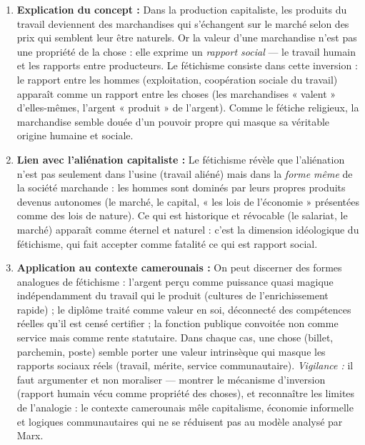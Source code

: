 \documentclass[11pt]{article}
\begin{document}
\begin{corrige}
\begin{enumerate}
\item \textbf{Explication du concept :} Dans la production capitaliste, les produits du travail deviennent des marchandises qui s'échangent sur le marché selon des prix qui semblent leur être naturels. Or la valeur d'une marchandise n'est pas une propriété de la chose : elle exprime un \emph{rapport social} — le travail humain et les rapports entre producteurs. Le fétichisme consiste dans cette inversion : le rapport entre les hommes (exploitation, coopération sociale du travail) apparaît comme un rapport entre les choses (les marchandises « valent » d'elles-mêmes, l'argent « produit » de l'argent). Comme le fétiche religieux, la marchandise semble douée d'un pouvoir propre qui masque sa véritable origine humaine et sociale.
\item \textbf{Lien avec l'aliénation capitaliste :} Le fétichisme révèle que l'aliénation n'est pas seulement dans l'usine (travail aliéné) mais dans la \emph{forme même} de la société marchande : les hommes sont dominés par leurs propres produits devenus autonomes (le marché, le capital, « les lois de l'économie » présentées comme des lois de nature). Ce qui est historique et révocable (le salariat, le marché) apparaît comme éternel et naturel : c'est la dimension idéologique du fétichisme, qui fait accepter comme fatalité ce qui est rapport social.
\item \textbf{Application au contexte camerounais :} On peut discerner des formes analogues de fétichisme : l'argent perçu comme puissance quasi magique indépendamment du travail qui le produit (cultures de l'enrichissement rapide) ; le diplôme traité comme valeur en soi, déconnecté des compétences réelles qu'il est censé certifier ; la fonction publique convoitée non comme service mais comme rente statutaire. Dans chaque cas, une chose (billet, parchemin, poste) semble porter une valeur intrinsèque qui masque les rapports sociaux réels (travail, mérite, service communautaire). \emph{Vigilance :} il faut argumenter et non moraliser — montrer le mécanisme d'inversion (rapport humain vécu comme propriété des choses), et reconnaître les limites de l'analogie : le contexte camerounais mêle capitalisme, économie informelle et logiques communautaires qui ne se réduisent pas au modèle analysé par Marx.
\end{enumerate}
\end{corrige}
\end{document}
